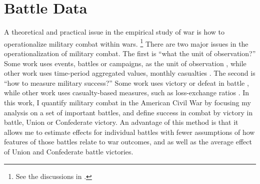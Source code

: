 \section{Battle Data}
\label{sec:battle-data}

A theoretical and practical issue in the empirical study of war is how to operationalize military combat within wars.%
\footnote{
  See the discussions in \textcites{ReiterStam1998}{BiddleLong2004}{Reiter2003}{GrauerHorowitz2012}{Weisiger2015}.
}
There are two major issues in the operationalization of military combat.
The first is ``what the unit of observation?''
Some work uses events, \eg{}battles or campaigns, as the unit of observation \parencites{ReiterStam1998}{ReiterStam2002}{Ramsay2008}[59-60]{Reiter2009}{PilsterBoehmelt2011a}{GrauerHorowitz2012}, while other work uses time-period aggregated values, \eg{}monthly casualties \textcite{Weisiger2015}.
The second is ``how to measure military success?''
Some work uses victory or defeat in battle \parencites{ReiterStam1998}{ReiterStam2002}{GrauerHorowitz2012}, while other work uses casualty-based measures, such as loss-exchange ratios  \parencites{Biddle2004}{BiddleLong2004}{PilsterBoehmelt2011a}.
In this work, I quantify military combat in the American Civil War by focusing my analysis on a set of important battles, and define success in combat by victory in battle, \ie{}Union or Confederate victory.
An advantage of this method is that it allows me to estimate effects for individual battles with fewer assumptions of how features of those battles relate to war outcomes, and as well as the average effect of Union and Confederate battle victories.

